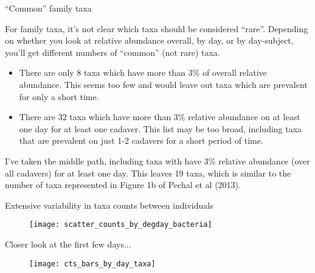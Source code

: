\documentclass{beamer}
\begin{document}
\begin{frame}{``Common'' family taxa}

\noindent For family taxa, it's not clear which taxa should be
considered ``rare''.  Depending on whether you look at relative
abundance overall, by day, or by day-subject, you'll get different
numbers of ``common'' (not rare) taxa.
  
\begin{itemize}
\item There are only 8 taxa which have more than 3\% of overall relative abundance.  This seems too few and would leave out taxa which are prevalent for only a short time.
\item There are 32 taxa which have more than 3\% relative abundance on at least one day for at least one cadaver.  This list may be too broad, including taxa that are prevalent on just 1-2 cadavers for a short period of time.
\end{itemize}

\vspace{0.05in}

\noindent I've taken the middle path, including taxa with have 3\%
relative abundance (over all cadavers) for at least one day.  This
leaves 19 taxa, which is similar to the number of taxa represented in
Figure 1b of Pechal et al (2013).

\end{frame}




\begin{frame}{Extensive variability in taxa counts between individuals}

\begin{center}
\begin{figure}
  \texttt{[image: scatter\_counts\_by\_degday\_bacteria]}
\end{figure}
\end{center}

\end{frame}


\begin{frame}{Closer look at the first few days...}

\begin{center}
\begin{figure}
  \texttt{[image: cts\_bars\_by\_day\_taxa]}
\end{figure}
\end{center}

\end{frame}
\end{document}
